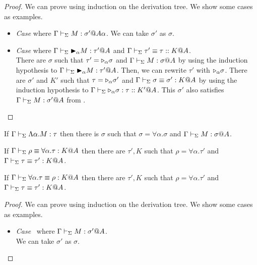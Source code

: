 \begin{proof}
	We can prove using induction on the derivation tree.
	We show some cases as examples.
				
\begin{itemize}
	\item \textit{Case} \TTB{} where \(\Gamma \vdash_\Sigma M : \sigma'@A\alpha\).
		  We can take $\sigma'$ as $\sigma$.	      	      		      	      	      	      	      
	\item \textit{Case} \TConv{} where \( \Gamma \vdash_\Sigma {\mathop{\blacktriangleright}}_\alpha M : \tau'@A \) and \( \Gamma\vdash_\Sigma\tau' \equiv \tau :: K@A \).\\
		  There are $\sigma$ such that $\tau' = {\mathop{\triangleright}}_\alpha \sigma$ and $\G \V M : \sigma@A$
		  by using the induction hypothesis to \( \Gamma \vdash_\Sigma {\mathop{\blacktriangleright}}_\alpha M : \tau' @A\).
		  Then, we can rewrite $\tau'$ with ${\mathop{\triangleright}}_\alpha \sigma$.
		  There are $\sigma'$ and $K'$ such that $\tau = {\mathop{\triangleright}}_\alpha \sigma'$ and $\Gamma \vdash_\Sigma \sigma \equiv \sigma' : K @ A$
		  by using the induction hypothesis to \( \Gamma \vdash_\Sigma {\mathop{\triangleright}}_\alpha \sigma : \tau :: K' @A\).
		  This $\sigma'$ also satisfies $\Gamma \vdash_\Sigma M : \sigma' @ A $ from \TConv.
\end{itemize}
\end{proof}	

\begin{lemma}
	\begin{item}
	      \item If $\Gamma \vdash_\Sigma \Lambda\alpha.M : \tau$ then 
	      there is $\sigma$ such that $\sigma = \forall\alpha.\sigma$ and $\G \V M : \sigma@A$.%
	      \item If $\Gamma \vdash_\Sigma \rho \equiv \forall\alpha.\tau : K @A$ then there are $\tau', K$ such that
	      $\rho = \forall\alpha.\tau'$ and $\Gamma \vdash_\Sigma \tau \equiv \tau' : K @A$.
	      \item If $\Gamma \vdash_\Sigma \forall\alpha.\tau \equiv \rho : K @A$ then there are $\tau', K$ such that
	      $\rho = \forall\alpha.\tau'$ and $\Gamma \vdash_\Sigma \tau \equiv \tau' : K @A$.
	\end{item}
\end{lemma}

\begin{proof}
	We can prove using induction on the derivation tree.
	We show some cases as examples.
		
	\begin{itemize}
		\newcommand{\MC}[1]{\mathcal{#1}}
		\item \textit{Case} \TGen\ where $\Gamma\vdash_\Sigma M:\sigma'@A$.\\
		      We can take $\sigma'$ as $\sigma$.	      	      		      	      	      	      
	\end{itemize}
\end{proof}
		
